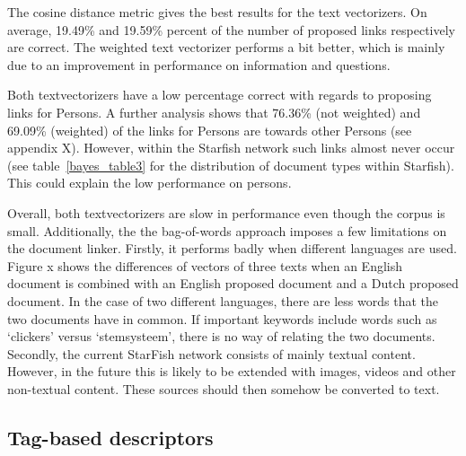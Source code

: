The cosine distance metric gives the best results for the text vectorizers. On
average, 19.49\% and 19.59\% percent of the number of proposed links
respectively are correct. The weighted text vectorizer performs a bit better,
which is mainly due to an improvement in performance on information and
questions. %

Both textvectorizers have a low percentage correct with regards to proposing
links for Persons. A further analysis shows that 76.36\% (not weighted) and
69.09\% (weighted) of the links for Persons are towards other Persons (see
appendix X). However, within the Starfish network such links almost never occur
(see table~\ref{bayes_table3} for the distribution of document types within
Starfish). This could explain the low performance on persons. 

Overall, both textvectorizers are slow in performance even though the corpus is
small. Additionally, the the bag-of-words approach imposes a few limitations on
the document linker. Firstly, it performs badly when different languages are
used. Figure x shows the differences of vectors of three texts when an English
document is combined with an English proposed document and a Dutch proposed
document. In the case of two different languages, there are less words that the
two documents have in common. If important keywords include words such as
`clickers' versus `stemsysteem', there is no way of relating the two documents.
Secondly, the current StarFish network consists of mainly textual content.
However, in the future this is likely to be extended with images, videos and
other non-textual content. These sources should then somehow be converted to
text.

\subsection{Tag-based descriptors}

